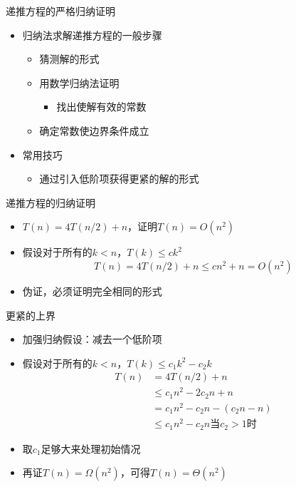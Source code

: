 \documentclass{ctexbeamer}
\begin{document}
    \begin{frame}{递推方程的严格归纳证明}
    \begin{itemize} 
        \setlength{\itemsep}{1em}
        \item 归纳法求解递推方程的一般步骤
        \begin{itemize}
        \setlength{\itemsep}{0.8em}
        \item 猜测解的形式
        \item 用数学归纳法证明
            \begin{itemize}\item 找出使解有效的常数\end{itemize}
        \item 确定常数使边界条件成立
        \end{itemize}
        \item 常用技巧
        \begin{itemize}\item 通过引入低阶项获得更紧的解的形式\end{itemize}
    \end{itemize}
    \end{frame}

    \begin{frame}{递推方程的归纳证明}
    \begin{itemize}
        \setlength{\itemsep}{1em}
        \item $T(n)=4T(n/2)+n$，证明$T(n)=O(n^2)$
        \item 假设对于所有的$k<n$，$T(k)\leq ck^2$\\
        $$T(n)=4T(n/2)+n\leq cn^2+n=O(n^2)$$
        \item 伪证，必须证明完全相同的形式
    \end{itemize}
    \end{frame}

    \begin{frame}{更紧的上界}
    \begin{itemize}
        \setlength{\itemsep}{1em}
        \item 加强归纳假设：减去一个低阶项
        \item 假设对于所有的$k<n$，$T(k)\leq c_1k^2-c_2k$\\
        \begin{align*}T(n)&=4T(n/2)+n\\&\leq c_1n^2-2c_2n+n\\&=c_1n^2-c_2n-(c_2n-n) \\ &\leq c_1n^2-c_2n \text{当}c_2>1\text{时}\end{align*}
        \item 取$c_1$足够大来处理初始情况
        \item 再证$T(n)=\Omega(n^2)$，可得$T(n)=\Theta(n^2)$
    \end{itemize}
    \end{frame}

\end{document}
